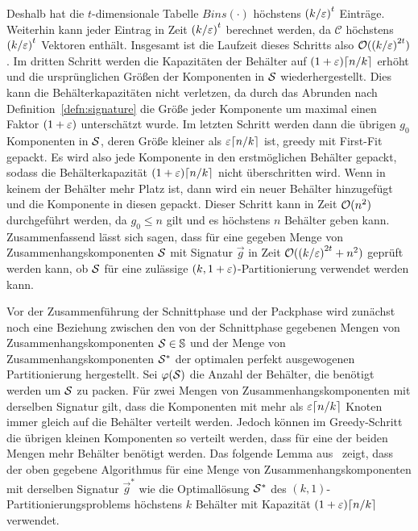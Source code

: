 Deshalb hat die $t$-dimensionale Tabelle $Bins(\cdot)$ höchstens ${(k/\varepsilon)}^t$ Einträge. 
Weiterhin kann jeder Eintrag in Zeit ${(k/\varepsilon)}^t$ berechnet werden, da $\mathcal{C}$ höchstens ${(k/\varepsilon)}^t$ Vektoren enthält.
Insgesamt ist die Laufzeit dieses Schritts also $\mathcal{O}({(k/\varepsilon)}^{2t})$.
Im dritten Schritt werden die Kapazitäten der Behälter auf $(1 + \eps) \ceil*{n/k}$ erhöht und die ursprünglichen Größen der Komponenten in $\mathcal{S}$ wiederhergestellt.
Dies kann die Behälterkapazitäten nicht verletzen, da durch das Abrunden nach Definition~\ref{defn:signature} die Größe jeder Komponente um maximal  einen Faktor $(1 + \varepsilon)$ unterschätzt wurde.
Im letzten Schritt werden dann die übrigen $g_0$ Komponenten in $\mathcal{S}$, deren Größe kleiner als $\eps \ceil*{n/k}$ ist, greedy mit First-Fit gepackt. 
Es wird also jede Komponente in den erstmöglichen Behälter gepackt, sodass die Behälterkapazität $(1 + \eps) \ceil*{n/k}$ nicht überschritten wird.
Wenn in keinem der Behälter mehr Platz ist, dann wird ein neuer Behälter hinzugefügt und die Komponente in diesen gepackt.
Dieser Schritt kann in Zeit  $\mathcal{O}(n^2)$ durchgeführt werden, da $g_0 \leq n$ gilt und es höchstens $n$ Behälter geben kann.
Zusammenfassend lässt sich sagen, dass für eine gegeben Menge von Zusammenhangskomponenten $\mathcal{S}$ mit Signatur $\vec{g}$ in Zeit $\mathcal{O}({(k/\varepsilon)}^{2t} + n^2)$ geprüft werden kann, ob $\mathcal{S}$ für eine zulässige $(k, 1 + \varepsilon)$\hyp Partitionierung verwendet werden kann.

Vor der Zusammenführung der Schnittphase und der Packphase wird zunächst noch eine Beziehung zwischen den von der Schnittphase gegebenen Mengen von Zusammenhangskomponenten $\mathcal{S} \in \mathbb{S}$ und der Menge von Zusammenhangskomponenten $\mathcal{S}^*$ der optimalen perfekt ausgewogenen Partitionierung hergestellt.
Sei $\varphi(\mathcal{S})$ die Anzahl der Behälter, die benötigt werden um $\mathcal{S}$ zu packen.
Für zwei Mengen von Zusammenhangskomponenten mit derselben Signatur gilt, dass die Komponenten mit mehr als $\eps \ceil*{n/k}$ Knoten immer gleich auf die Behälter verteilt werden.
Jedoch können im Greedy-Schritt die übrigen kleinen Komponenten so verteilt werden, dass für eine der beiden Mengen mehr Behälter benötigt werden.
Das folgende Lemma aus~\parencite{ff13} zeigt, dass der oben gegebene Algorithmus für eine Menge von Zusammenhangskomponenten mit derselben Signatur $\vec{g}^*$ wie die Optimallösung $\mathcal{S}^*$ des $(k, 1)$\hyp Partitionierungsproblems höchstens $k$ Behälter mit Kapazität $(1 + \eps) \ceil*{n/k}$ verwendet. \\

